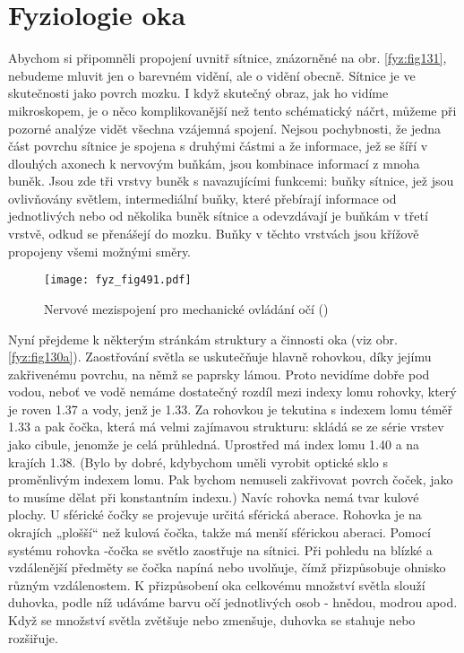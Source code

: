   \section{Fyziologie oka}\label{fyz:IchapXXXVIsecII}
    Abychom si připomněli propojení uvnitř sítnice, znázorněné na obr. \ref {fyz:fig131}, nebudeme
    mluvit jen o barevném vidění, ale o vidění obecně. Sítnice je ve skutečnosti jako povrch mozku.
    I když skutečný obraz, jak ho vidíme mikroskopem, je o něco komplikovanější než tento
    schématický náčrt, můžeme při pozorné analýze vidět všechna vzájemná spojení. Nejsou
    pochybnosti, že jedna část povrchu sítnice je spojena s druhými částmi a že informace, jež se
    šíří v dlouhých axonech k nervovým buňkám, jsou kombinace informací z mnoha buněk. Jsou zde tři
    vrstvy buněk s navazujícími funkcemi: buňky sítnice, jež jsou ovlivňovány světlem, intermediální
    buňky, které přebírají informace od jednotlivých nebo od několika buněk sítnice a odevzdávají je
    buňkám v třetí vrstvě, odkud se přenášejí do mozku. Buňky v těchto vrstvách jsou křížově
    propojeny všemi možnými směry.
    
    \begin{figure}[ht!] %
      \centering
      \texttt{[image: fyz\_fig491.pdf]}
      \caption{Nervové mezispojení pro mechanické ovládání očí (\cite[s.~697]{Feynman01})}
      \label{fyz:fig491}
    \end{figure}

    Nyní přejdeme k některým stránkám struktury a činnosti oka (viz obr. \ref {fyz:fig130a}).
    Zaostřování světla se uskutečňuje hlavně rohovkou, díky jejímu zakřivenému povrchu, na němž se
    paprsky lámou. Proto nevidíme dobře pod vodou, neboť ve vodě nemáme dostatečný rozdíl mezi
    indexy lomu rohovky, který je roven \num{1.37} a vody, jenž je \num{1.33}. Za rohovkou je
    tekutina s indexem lomu téměř \num{1.33} a pak čočka, která má velmi zajímavou strukturu: skládá
    se ze série vrstev jako cibule, jenomže je celá průhledná. Uprostřed má index lomu \num{1.40} a
    na krajích \num{1.38}. (Bylo by dobré, kdybychom uměli vyrobit optické sklo s proměnlivým
    indexem lomu. Pak bychom nemuseli zakřivovat povrch čoček, jako to musíme dělat při konstantním
    indexu.) Navíc rohovka nemá tvar kulové plochy. U sférické čočky se projevuje určitá sférická
    aberace. Rohovka je na okrajích „plošší“ než kulová čočka, takže má menší sférickou aberaci.
    Pomocí systému rohovka -čočka se světlo zaostřuje na sítnici. Při pohledu na blízké a
    vzdálenější předměty se čočka napíná nebo uvolňuje, čímž přizpůsobuje ohnisko různým
    vzdálenostem. K přizpůsobení oka celkovému množství světla slouží duhovka, podle níž udáváme
    barvu očí jednotlivých osob - hnědou, modrou apod. Když se množství světla zvětšuje nebo
    zmenšuje, duhovka se stahuje nebo rozšiřuje. 
    
